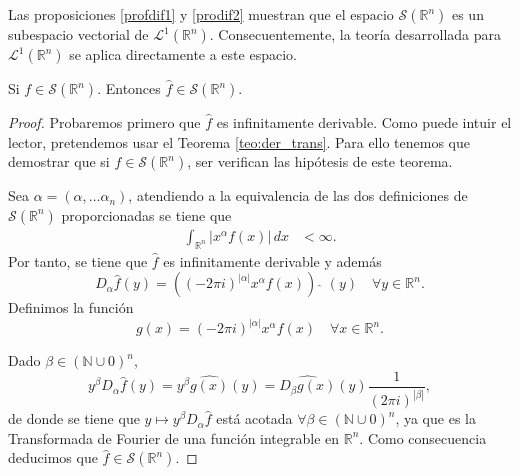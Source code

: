 \begin{observacion}
\noindent Las proposiciones \ref{profdif1} y \ref{prodif2} muestran que el espacio $\mathscr{S}(\mathbb{R}^n)$ es un subespacio vectorial de  $\mathscr{L}^1(\mathbb{R}^n)$.
Consecuentemente, la teoría desarrollada para $\mathscr{L}^1(\mathbb{R}^n)$ se aplica directamente a este espacio.
\end{observacion}

\begin{proposicion}\label{propopes}
    Si $f \in \mathscr{S}(\mathbb{R}^n)$. Entonces $\widehat{f} \in \mathscr{S}(\mathbb{R}^n)$.
\end{proposicion}

\begin{proof}
    Probaremos primero que $\widehat{f}$ es infinitamente derivable. Como puede intuir el lector, pretendemos usar el Teorema \ref{teo:der_trans}. Para ello tenemos que demostrar que si $f \in \mathscr{S}(\mathbb{R}^n)$, ser verifican las hipótesis de este teorema.
    
\noindent  Sea $\alpha = (\alpha, \ldots \alpha_n)$, atendiendo a la equivalencia de las dos definiciones de $\mathscr{S}(\mathbb{R}^n)$ proporcionadas se tiene que 
\begin{equation}
\begin{aligned}
   \int_{\mathbb{R}^n}|x^{\alpha}f(x)| \, dx 
   &< \infty.
\end{aligned}
\end{equation}
\noindent Por tanto, se tiene que $\widehat{f}$ es infinitamente derivable y además
      \begin{equation}
     D_{\alpha}\widehat{f}(y) = ((-2 \pi i)^{|\alpha|}x^{\alpha} f (x))\,\,\widehat{  } \,\, (y) \quad \forall y \in \mathbb{R}^n.
   \end{equation}
Definimos la función 
\begin{equation}
g(x) = (-2 \pi i)^{|\alpha|}x^{\alpha} f (x) \quad \forall x \in \mathbb{R}^n.
\end{equation}

\noindent Dado $\beta \in  (\mathbb{N} \cup {0})^n $,
    \begin{equation}
     y^{\beta}D_{\alpha}\widehat{f}(y) =  y^{\beta}\widehat{g(x)}(y) = \widehat{D_{\beta}g(x)}(y) \frac{1}{(2 \pi i)^{|\beta|}},
    \end{equation}
de donde se tiene que $y \mapsto y^{\beta}D_{\alpha}\widehat{f}$ está acotada $\forall \beta \in  (\mathbb{N} \cup {0})^n $, ya que es la Transformada de Fourier de una función integrable en $\mathbb{R}^n$. 
Como consecuencia deducimos que  $\widehat{f} \in \mathscr{S}(\mathbb{R}^n)$. 
\end{proof} 





